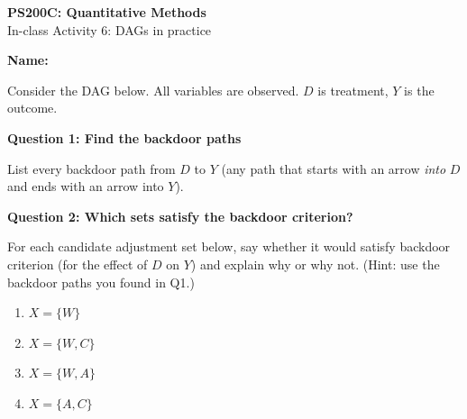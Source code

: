 \documentclass[11pt]{article}
\begin{document}
\begin{center}
{\Large \textbf{PS200C: Quantitative Methods}} \\[6pt]
{\large In-class Activity 6: DAGs in practice}
\end{center}

\vspace{4pt}
\noindent\textbf{Name:} \hrulefill

\vspace{12pt}

\noindent Consider the DAG below.  All variables are observed.  $D$ is treatment, $Y$ is the outcome.

\begin{center}
\end{center}

\vspace{4pt}

\noindent\textbf{Question 1: Find the backdoor paths}

\medskip
\noindent List every backdoor path from $D$ to $Y$ (any path that starts with an arrow \textit{into} $D$ and ends with an arrow into $Y$).

\vspace{3.5cm}

\noindent\textbf{Question 2: Which sets satisfy the backdoor criterion?}

\medskip
\noindent For each candidate adjustment set below, say whether it would satisfy backdoor criterion (for the effect of $D$ on $Y$) and explain why or why not.  (Hint: use the backdoor paths you found in Q1.)

\begin{enumerate}[label=(\alph*), itemsep=1.8em]
\item $X = \{W\}$\\[4pt]

\item $X = \{W, C\}$ \\[4pt]

\item $X = \{W, A\}$ \\[4pt]

\item $X = \{A, C\}$ \\[4pt]
\end{enumerate}
\end{document}
